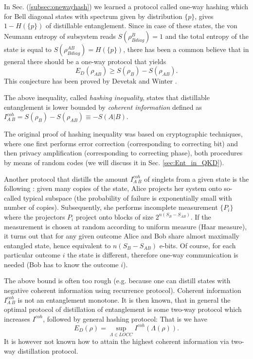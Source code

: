 \documentclass[twocolumn,aps,rmp]{revtex4}
\begin{document}
In Sec. (\ref{subsec:onewayhash}) we learned a protocol called one-way
hashing which for Bell diagonal states with spectrum given by
distribution $\{p\}$, gives $1-H(\{p\})$ of distillable
entanglement. Since in case of these states, the von Neumann entropy
of subsystem reads $S(\rho^{B}_{Bdiag})=1$ and the total entropy of
the state is equal to $S(\rho^{AB}_{Bdiag})=H(\{p\})$, there has been
a common believe that in general there should be a one-way protocol
that yields \begin{equation} E_D(\rho_{AB})\geq S(\rho_{B})- S(\rho_{AB}).  \end{equation}
This conjecture has been proved by Devetak and Winter
\cite{DevetakWinter-hash}.

The above inequality, called {\it hashing inequality}, states that
distillable entanglement is lower bounded by {\it coherent
  information} defined as $I^{coh}_{A\>B}=S(\rho_B)-S(\rho_{AB})\equiv
-S(A|B)$.

The original proof of hashing inequality
\cite{DevetakWinter-hash,DevetakWinter-hash-prl} was based on
cryptographic techniques, where one first performs error correction
(corresponding to correcting bit) and then privacy amplification
(corresponding to correcting phase), both procedures by means of
random codes (we will discuss it in Sec. \ref{sec:Ent_in_QKD}).

Another protocol that distills the amount $I^{coh}_{A\>B}$ of singlets
from a given state is the following \cite{SW-nature,sw-long}: given
many copies of the state, Alice projects her system onto so-called
typical subspace \cite{Schumacher1995} (the probability of failure is
exponentially small with number of copies). Subsequently, she performs
incomplete measurement $\{P_i\}$ where the projectors $P_i$ project
onto blocks of size $2^{n (S_B-S_{AB})}$. If the measurement is chosen
at random according to uniform measure (Haar measure), it turns out
that for any given outcome Alice and Bob share almost maximally
entangled state, hence equivalent to $n(S_B -S_{AB})$ e-bits. Of
course, for each particular outcome $i$ the state is different,
therefore one-way communication is needed (Bob has to know the outcome
$i$).

The above bound is often too rough (e.g. because one can distill
states with negative coherent information using recurrence
protocol). Coherent information $I^{coh}_{A\>B}$
is not an entanglement monotone. It is then known, that in general
the optimal protocol of distillation of entanglement is some two-way
protocol which increases $I^{coh}$, followed by general hashing
protocol: That is we have \cite{HHH-cap2000}
\begin{equation} E_D(\rho) = \sup_{\Lambda \in LOCC} I^{coh}(\Lambda(\rho)). \end{equation}
It is however not
known how to attain the highest coherent information via two-way distillation protocol.
\end{document}

